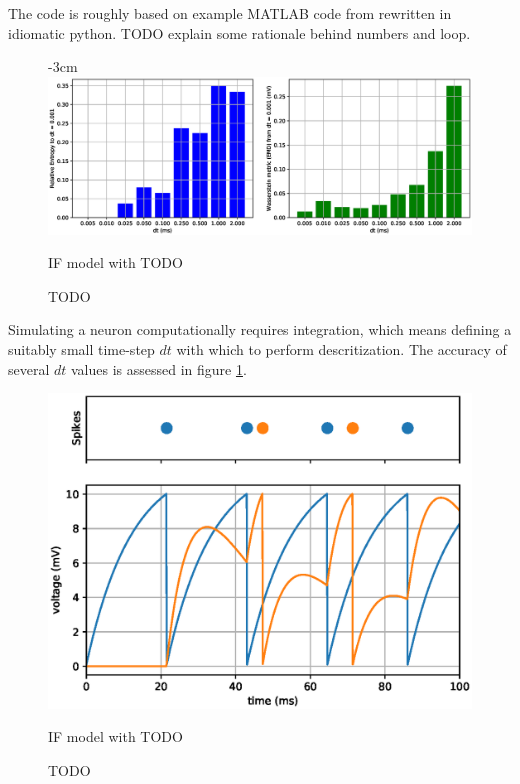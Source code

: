 The code is roughly based on example MATLAB code from \autocite[table
3.1]{trappenberg_fundamentals_2009} rewritten in idiomatic python. TODO explain
some rationale behind numbers and loop.

\begin{figure}[h!]
    \centering
    \addtolength{\leftskip} {-3cm}
    \addtolength{\rightskip}{-3cm}
    \includegraphics[width=1.4\linewidth]{figures/graphs/entropyofdt.eps}
    \caption{IF model with TODO}
    \caption{TODO}
    \label{fig:entropyofdt}
\end{figure}

Simulating a
neuron computationally requires integration, which means defining a suitably
small time-step $dt$ with which to perform descritization. The accuracy of
several $dt$ values is assessed in figure \ref{fig:entropyofdt}.

\begin{figure}[ht]
    \centering
    \includegraphics[width=.6\linewidth]{figures/graphs/dualSpikingNeuron.eps}
    \caption{IF model with TODO}
    \caption{TODO}
    \label{fig:LIFDoubleGraph}
\end{figure}



\pagebreak


